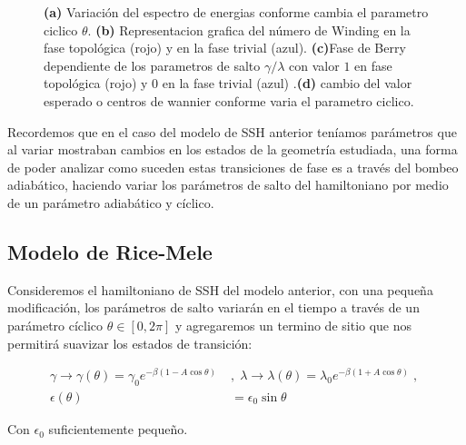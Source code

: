 \begin{figure}[tbh!]
\begin{subfigure}[b!]{0.25 \textwidth}
     \end{subfigure}
     \caption{\textbf{(a)} Variación del espectro de energias conforme cambia el parametro ciclico $\theta$. \textbf{(b)} Representacion grafica del número de Winding en la fase topológica (rojo) y en la fase trivial (azul). \textbf{(c)}Fase de Berry dependiente de los parametros de salto $\gamma/\lambda$ con valor $1$ en fase topológica (rojo) y $0$ en la fase trivial (azul) .\textbf{(d)} cambio del valor esperado o centros de wannier conforme varia el parametro ciclico.}
    \label{fig:Pump_example_Results}
\end{figure}


Recordemos que en el caso del modelo de SSH anterior teníamos parámetros que al variar mostraban cambios en los estados de la geometría estudiada, una forma de poder analizar como suceden estas transiciones de fase es a través del bombeo adiabático, haciendo variar los parámetros de salto del hamiltoniano por medio de un parámetro adiabático y cíclico.

\subsection{Modelo de Rice-Mele}

Consideremos el hamiltoniano de SSH del modelo anterior, con una pequeña modificación, los parámetros de salto variarán en el tiempo a través de un parámetro cíclico $\theta \in \left[ 0 , 2\pi\right]$ y agregaremos un termino de sitio que nos permitirá suavizar los estados de transición:


\begin{align}
    \nonumber\gamma \rightarrow \gamma (\theta) = \gamma_0 e^{\displaystyle-\beta(1 - A \cos \theta )} \; &,\;  \lambda \rightarrow \lambda(\theta) = \lambda_0 e^{\displaystyle-\beta( 1 + A \cos \theta )} \;,\; \\  \epsilon(\theta) &= \epsilon_0 \sin \theta
\end{align}

Con $\epsilon_0$ suficientemente pequeño.

